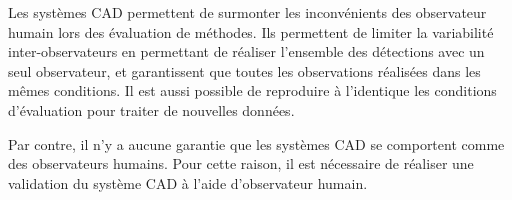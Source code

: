 Les systèmes CAD permettent de surmonter les inconvénients des observateur humain lors des évaluation de méthodes. Ils permettent de limiter la variabilité inter-observateurs en permettant de réaliser l'ensemble des détections avec un seul observateur, et garantissent que toutes les observations réalisées dans les mêmes conditions. Il est aussi possible de reproduire à l'identique les conditions d'évaluation pour traiter de nouvelles données.

Par contre, il n'y a aucune garantie que les systèmes CAD se comportent comme des observateurs humains. Pour cette raison, il est nécessaire de réaliser une validation du système CAD à l'aide d'observateur humain.
